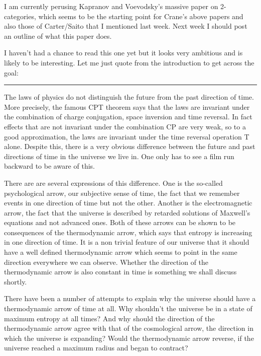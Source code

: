 \documentclass{article}
\def\tightlist{}
\renewcommand{\texttt}[1]{%
  \begingroup
  \ttfamily
  \begingroup\lccode`~=`/\lowercase{\endgroup\def~}{/\discretionary{}{}{}}%
  \begingroup\lccode`~=`[\lowercase{\endgroup\def~}{[\discretionary{}{}{}}%
  \begingroup\lccode`~=`.\lowercase{\endgroup\def~}{.\discretionary{}{}{}}%
  \catcode`/=\active\catcode`[=\active\catcode`.=\active
  \scantokens{#1\noexpand}%
  \endgroup
}
\begin{document}
I am currently perusing Kapranov and Voevodsky's massive paper on
2-categories, which seems to be the starting point for Crane's above
papers and also those of Carter/Saito that I mentioned last week. Next
week I should post an outline of what this paper does.


I haven't had a chance to read this one yet but it looks very ambitious
and is likely to be interesting. Let me just quote from the introduction
to get across the goal:

\begin{center}\rule{0.5\linewidth}{0.5pt}\end{center}

The laws of physics do not distinguish the future from the past
direction of time. More precisely, the famous CPT theorem says that the
laws are invariant under the combination of charge conjugation, space
inversion and time reversal. In fact effects that are not invariant
under the combination CP are very weak, so to a good approximation, the
laws are invariant under the time reversal operation T alone. Despite
this, there is a very obvious difference between the future and past
directions of time in the universe we live in. One only has to see a
film run backward to be aware of this.

There are are several expressions of this difference. One is the
so-called psychological arrow, our subjective sense of time, the fact
that we remember events in one direction of time but not the other.
Another is the electromagnetic arrow, the fact that the universe is
described by retarded solutions of Maxwell's equations and not advanced
ones. Both of these arrows can be shown to be consequences of the
thermodynamic arrow, which says that entropy is increasing in one
direction of time. It is a non trivial feature of our universe that it
should have a well defined thermodynamic arrow which seems to point in
the same direction everywhere we can observe. Whether the direction of
the thermodynamic arrow is also constant in time is something we shall
discuss shortly.

There have been a number of attempts to explain why the universe should
have a thermodynamic arrow of time at all. Why shouldn't the universe be
in a state of maximum entropy at all times? And why should the direction
of the thermodynamic arrow agree with that of the cosmological arrow,
the direction in which the universe is expanding? Would the
thermodynamic arrow reverse, if the universe reached a maximum radius
and began to contract?
\end{document}
